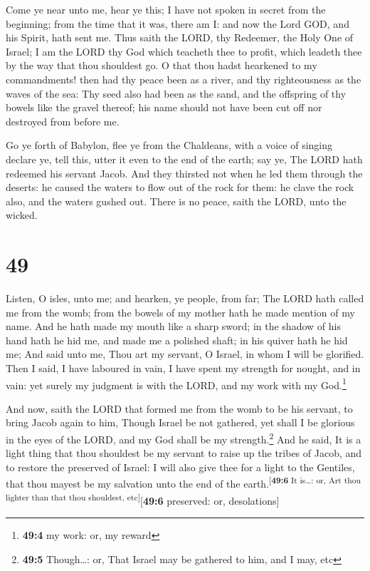  Come ye near unto me, hear ye this; I have not spoken in
secret from the beginning; from the time that it was, there am I: and
now the Lord GOD, and his Spirit, hath sent me.  Thus
saith the LORD, thy Redeemer, the Holy One of Israel; I am the LORD thy
God which teacheth thee to profit, which leadeth thee by the way that
thou shouldest go.  O that thou hadst hearkened to my
commandments! then had thy peace been as a river, and thy righteousness
as the waves of the sea:  Thy seed also had been as the
sand, and the offspring of thy bowels like the gravel thereof; his name
should not have been cut off nor destroyed from before me.

 Go ye forth of Babylon, flee ye from the Chaldeans, with
a voice of singing declare ye, tell this, utter it even to the end of
the earth; say ye, The LORD hath redeemed his servant Jacob.
 And they thirsted not when he led them through the
deserts: he caused the waters to flow out of the rock for them: he clave
the rock also, and the waters gushed out.  There is no
peace, saith the LORD, unto the wicked.

\hypertarget{section-48}{%
\section{49}\label{section-48}}

 Listen, O isles, unto me; and hearken, ye people, from
far; The LORD hath called me from the womb; from the bowels of my mother
hath he made mention of my name.  And he hath made my
mouth like a sharp sword; in the shadow of his hand hath he hid me, and
made me a polished shaft; in his quiver hath he hid me; 
And said unto me, Thou art my servant, O Israel, in whom I will be
glorified.  Then I said, I have laboured in vain, I have
spent my strength for nought, and in vain: yet surely my judgment is
with the LORD, and my work with my God.\footnote{\textbf{49:4} my work:
  or, my reward}

 And now, saith the LORD that formed me from the womb to
be his servant, to bring Jacob again to him, Though Israel be not
gathered, yet shall I be glorious in the eyes of the LORD, and my God
shall be my strength.\footnote{\textbf{49:5} Though\ldots: or, That
  Israel may be gathered to him, and I may, etc}  And he
said, It is a light thing that thou shouldest be my servant to raise up
the tribes of Jacob, and to restore the preserved of Israel: I will also
give thee for a light to the Gentiles, that thou mayest be my salvation
unto the end of the earth.\textsuperscript{{[}\textbf{49:6} It is\ldots:
or, Art thou lighter than that thou shouldest, etc{]}}{[}\textbf{49:6}
preserved: or, desolations{]}

